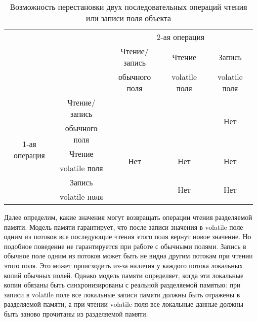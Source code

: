 \documentclass[14pt,titlepage]{extarticle}
\newcommand{\eng}[1]{{\English#1}}
\begin{document}
      \begin{table}[!htb]
        \centering

        \def\yes{\multirow{2}{*}{}}
        \def\no{\multirow{2}{*}{Нет}}

        \begin{tabular}{ |c|c|c|c|c| }
          \cline{3-5}
          \multicolumn{2}{c|}{} & \multicolumn{3}{c|}{2-ая операция} \\
          \cline{3-5}
          \multicolumn{2}{c|}{} & Чтение/запись & Чтение              & Запись \\
          \multicolumn{2}{c|}{} & обычного поля & \eng{volatile} поля & \eng{volatile} поля \\
          \hline
          \multirow{6}{*}{\begin{sideways}1-ая операция\end{sideways}}
          & Чтение/запись       & \yes & \yes & \no \\
          & обычного поля       &      &      &     \\ \cline{2-5}
          & Чтение              & \no  & \no  & \no \\
          & \eng{volatile} поля &      &      &     \\ \cline{2-5}
          & Запись              & \yes & \no  & \no \\
          & \eng{volatile} поля &      &      &     \\ \hline
        \end{tabular}
        \caption{Возможность перестановки двух последовательных операций чтения
                 или записи поля объекта}
        \label{tabular:can_reorder}
      \end{table}

      Далее определим, какие значения могут возвращать операции чтения
      разделяемой памяти. Модель памяти гарантирует, что после записи значения
      в \eng{volatile} поле одним из потоков все последующие чтения этого поля
      вернут новое значение. Но подобное поведение не гарантируется при работе
      с обычными полями. Запись в обычное поле одним из потоков может быть не
      видна другим потокам при чтении этого поля. Это может происходить из-за
      наличия у каждого потока локальных копий обычных полей.  Однако модель
      памяти определяет, когда эти локальные копии обязаны быть
      синхронизированы с реальной разделяемой памятью: при записи в
      \eng{volatile} поле все локальные записи памяти должны быть отражены в
      разделяемой памяти, а при чтении \eng{volatile} поля все локальные данные
      должны быть заново прочитаны из разделяемой памяти.
\end{document}
